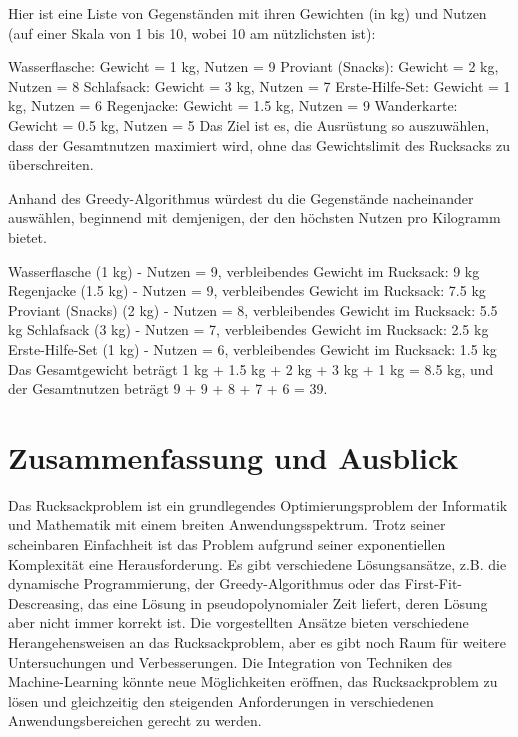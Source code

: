 \documentclass[12pt]{report}
\begin{document}
Hier ist eine Liste von Gegenständen mit ihren Gewichten (in kg) und Nutzen (auf einer Skala von 1 bis 10, wobei 10 am nützlichsten ist):

Wasserflasche: Gewicht = 1 kg, Nutzen = 9
Proviant (Snacks): Gewicht = 2 kg, Nutzen = 8
Schlafsack: Gewicht = 3 kg, Nutzen = 7
Erste-Hilfe-Set: Gewicht = 1 kg, Nutzen = 6
Regenjacke: Gewicht = 1.5 kg, Nutzen = 9
Wanderkarte: Gewicht = 0.5 kg, Nutzen = 5
Das Ziel ist es, die Ausrüstung so auszuwählen, dass der Gesamtnutzen maximiert wird, ohne das Gewichtslimit des Rucksacks zu überschreiten.

Anhand des Greedy-Algorithmus würdest du die Gegenstände nacheinander auswählen, beginnend mit demjenigen, der den höchsten Nutzen pro Kilogramm bietet.

Wasserflasche (1 kg) - Nutzen = 9, verbleibendes Gewicht im Rucksack: 9 kg
Regenjacke (1.5 kg) - Nutzen = 9, verbleibendes Gewicht im Rucksack: 7.5 kg
Proviant (Snacks) (2 kg) - Nutzen = 8, verbleibendes Gewicht im Rucksack: 5.5 kg
Schlafsack (3 kg) - Nutzen = 7, verbleibendes Gewicht im Rucksack: 2.5 kg
Erste-Hilfe-Set (1 kg) - Nutzen = 6, verbleibendes Gewicht im Rucksack: 1.5 kg
Das Gesamtgewicht beträgt 1 kg + 1.5 kg + 2 kg + 3 kg + 1 kg = 8.5 kg, und der Gesamtnutzen beträgt 9 + 9 + 8 + 7 + 6 = 39.



\newpage
\chapter{Zusammenfassung und Ausblick}
Das Rucksackproblem ist ein grundlegendes Optimierungsproblem der Informatik und Mathematik mit einem breiten Anwendungsspektrum. Trotz seiner scheinbaren Einfachheit ist das Problem aufgrund seiner exponentiellen Komplexität eine Herausforderung. Es gibt verschiedene Lösungsansätze, z.B. die dynamische Programmierung, der Greedy-Algorithmus oder das First-Fit-Descreasing, das eine Lösung in pseudopolynomialer Zeit liefert, deren Lösung aber nicht immer korrekt ist. Die vorgestellten Ansätze bieten verschiedene Herangehensweisen an das Rucksackproblem, aber es gibt noch Raum für weitere Untersuchungen und Verbesserungen. Die Integration von Techniken des Machine-Learning könnte neue Möglichkeiten eröffnen, das Rucksackproblem zu lösen und gleichzeitig den steigenden Anforderungen in verschiedenen Anwendungsbereichen gerecht zu werden.
\end{document}
